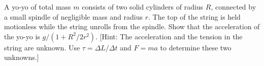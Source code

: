 A yo-yo of total mass $m$ consists of two solid
cylinders of radius $R$, connected by a small spindle of
negligible mass and radius $r$. The top of the string is
held motionless while the string unrolls from the spindle.
Show that the acceleration of the yo-yo is $g/(1+R^2/2r^2)$.
[Hint: The acceleration and the tension in the string are
unknown. Use $\tau =\Delta L/\Delta t$ and $F=ma$
to determine these two unknowns.]
